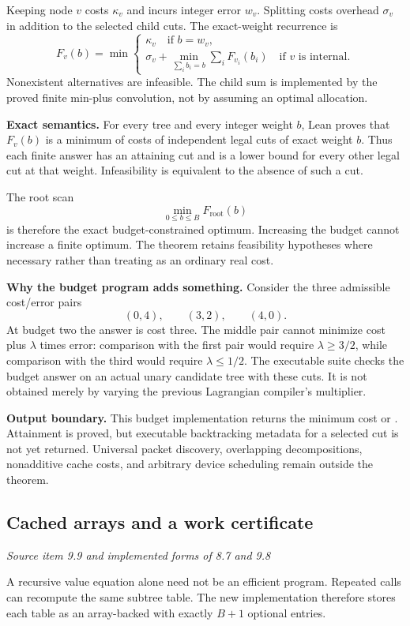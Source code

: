 Keeping node $v$ costs $\kappa_v$ and incurs integer error $w_v$. Splitting costs overhead $\sigma_v$ in addition to the selected child cuts. The exact-weight recurrence is
\[
F_v(b)=\min\left\{
\begin{array}{l}
\kappa_v\quad\text{if }b=w_v,\\[2pt]
\displaystyle\sigma_v+
\min_{\sum_i b_i=b}\sum_iF_{v_i}(b_i)\quad\text{if }v\text{ is internal}.
\end{array}\right.
\]
Nonexistent alternatives are infeasible. The child sum is implemented by the proved finite min-plus convolution, not by assuming an optimal allocation.

\textbf{Exact semantics.} For every tree and every integer weight $b$, Lean proves that $F_v(b)$ is a minimum of costs of independent legal cuts of exact weight $b$. Thus each finite answer has an attaining cut and is a lower bound for every other legal cut at that weight. Infeasibility is equivalent to the absence of such a cut.

The root scan
\[
\boxed{\min_{0\leq b\leq B}F_{\mathrm{root}}(b)}
\]
is therefore the exact budget-constrained optimum. Increasing the budget cannot increase a finite optimum. The theorem retains feasibility hypotheses where necessary rather than treating  as an ordinary real cost.

\textbf{Why the budget program adds something.} Consider the three admissible cost/error pairs
\[
(0,4),\qquad(3,2),\qquad(4,0).
\]
At budget two the answer is cost three. The middle pair cannot minimize cost plus $\lambda$ times error: comparison with the first pair would require $\lambda\geq3/2$, while comparison with the third would require $\lambda\leq1/2$. The executable suite checks the budget answer on an actual unary candidate tree with these cuts. It is not obtained merely by varying the previous Lagrangian compiler's multiplier.

\textbf{Output boundary.} This budget implementation returns the minimum cost or . Attainment is proved, but executable backtracking metadata for a selected cut is not yet returned. Universal packet discovery, overlapping decompositions, nonadditive cache costs, and arbitrary device scheduling remain outside the theorem.



\subsection{Cached arrays and a work certificate}\label{supp3:subsection:006}\textit{Source item 9.9 and implemented forms of 8.7 and 9.8}\par
A recursive value equation alone need not be an efficient program. Repeated calls can recompute the same subtree table. The new implementation therefore stores each table as an array-backed  with exactly $B+1$ optional entries.

